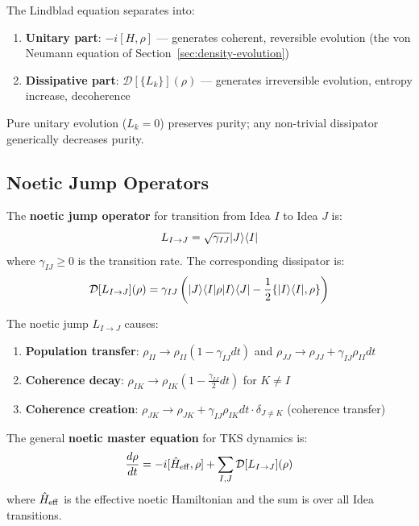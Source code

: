 \begin{remark}
\label{rem:unitary-vs-dissipative}
The Lindblad equation separates into:
\begin{enumerate}
  \item \textbf{Unitary part}: $-i[H, \rho]$ --- generates coherent, reversible evolution (the von Neumann equation of Section~\ref{sec:density-evolution})
  \item \textbf{Dissipative part}: $\mathcal{D}[\{L_k\}](\rho)$ --- generates irreversible evolution, entropy increase, decoherence
\end{enumerate}
Pure unitary evolution ($L_k = 0$) preserves purity; any non-trivial dissipator generically decreases purity.
\end{remark}

\subsection{Noetic Jump Operators}

\begin{definition}
\label{def:noetic-jump}
The \textbf{noetic jump operator} for transition from Idea $I$ to Idea $J$ is:
\[
L_{I \to J} = \sqrt{\gamma_{IJ}} |J\rangle\langle I|
\]
where $\gamma_{IJ} \geq 0$ is the transition rate. The corresponding dissipator is:
\[
\mathcal{D}[L_{I \to J}](\rho) = \gamma_{IJ} \left( |J\rangle\langle I| \rho |I\rangle\langle J| - \frac{1}{2}\{|I\rangle\langle I|, \rho\} \right)
\]
\end{definition}

\begin{proposition}
\label{prop:jump-effect}
The noetic jump $L_{I \to J}$ causes:
\begin{enumerate}
  \item \textbf{Population transfer}: $\rho_{II} \to \rho_{II}(1 - \gamma_{IJ} dt)$ and $\rho_{JJ} \to \rho_{JJ} + \gamma_{IJ} \rho_{II} dt$
  \item \textbf{Coherence decay}: $\rho_{IK} \to \rho_{IK}(1 - \frac{\gamma_{IJ}}{2} dt)$ for $K \neq I$
  \item \textbf{Coherence creation}: $\rho_{JK} \to \rho_{JK} + \gamma_{IJ} \rho_{IK} dt \cdot \delta_{J \neq K}$ (coherence transfer)
\end{enumerate}
\end{proposition}

\begin{definition}
\label{def:noetic-master-equation}
The general \textbf{noetic master equation} for TKS dynamics is:
\[
\frac{d\rho}{dt} = -i[\hat{H}_{\mathrm{eff}}, \rho] + \sum_{I,J} \mathcal{D}[L_{I \to J}](\rho)
\]
where $\hat{H}_{\mathrm{eff}}$ is the effective noetic Hamiltonian and the sum is over all Idea transitions.
\end{definition}

